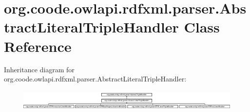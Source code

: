 \hypertarget{classorg_1_1coode_1_1owlapi_1_1rdfxml_1_1parser_1_1_abstract_literal_triple_handler}{\section{org.\-coode.\-owlapi.\-rdfxml.\-parser.\-Abstract\-Literal\-Triple\-Handler Class Reference}
\label{classorg_1_1coode_1_1owlapi_1_1rdfxml_1_1parser_1_1_abstract_literal_triple_handler}
}
Inheritance diagram for org.\-coode.\-owlapi.\-rdfxml.\-parser.\-Abstract\-Literal\-Triple\-Handler\-:\begin{figure}[H]
\begin{center}
\leavevmode
\includegraphics[height=1.055276cm]{classorg_1_1coode_1_1owlapi_1_1rdfxml_1_1parser_1_1_abstract_literal_triple_handler}
\end{center}
\end{figure}
